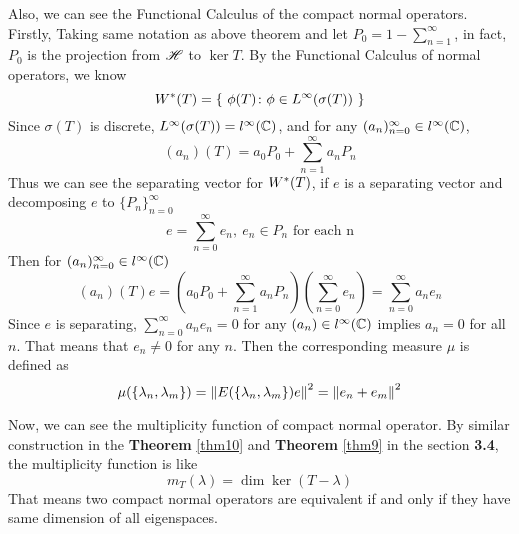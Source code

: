 Also, we can see the Functional Calculus of the compact normal operators. Firstly, Taking same notation as above theorem and let $P_0 = 1-\sum_{n=1}^{\infty}$, in fact, $P_0$ is the projection from $\mathscr{H}$ to $\ker{T}$. By the Functional Calculus of normal operators, we know
\begin{equation*}
	W^{*}(T) = \{~\phi(T) \colon \phi \in L^{\infty}(\sigma(T))~\}
\end{equation*}
Since $\sigma(T)$ is discrete, $L^{\infty}(\sigma(T)) = l^{\infty}(\mathbb{C})$, and for any $(a_n)_{n=0}^{\infty} \in l^{\infty}(\mathbb{C})$,
\begin{equation*}
	(a_n)(T) = a_0 P_0 + \sum_{n=1}^{\infty} a_n P_n
\end{equation*}
Thus we can see the separating vector for $W^{*}(T)$, if $e$ is a separating vector and decomposing $e$ to $\{P_n\}_{n=0}^{\infty}$
\begin{equation*}
	e = \sum_{n=0}^{\infty} e_n,~ e_n \in P_n \text{ for each n}
\end{equation*} 
Then for $(a_n)_{n=0}^{\infty} \in l^{\infty}(\mathbb{C})$
\begin{equation*}
	(a_n)(T)e = (a_0 P_0 + \sum_{n=1}^{\infty} a_n P_n)(\sum_{n=0}^{\infty} e_n) = \sum_{n=0}^{\infty} a_n e_n
\end{equation*}
Since $e$ is separating, $\sum_{n=0}^{\infty} a_n e_n = 0$ for any $(a_n) \in l^{\infty}(\mathbb{C})$ implies $a_n = 0$ for all $n$. That means that $e_n \neq 0$ for any $n$. Then the corresponding measure $\mu$ is defined as
\begin{equation*}
	\mu(\{\lambda_n,\lambda_m\}) = \left\lVert E(\{\lambda_n,\lambda_m\})e\right\lVert^2 = \left\lVert e_n+e_m\right\lVert^2
\end{equation*}

Now, we can see the multiplicity function of compact normal operator. By similar construction in the \textbf{Theorem} \ref{thm10} and \textbf{Theorem} \ref{thm9} in the section \textbf{3.4}, the multiplicity function is like
\begin{equation*}
	m_T(\lambda) = \dim{\ker{(T-\lambda)}}
\end{equation*}
That means two compact normal operators are equivalent if and only if they have same dimension of all eigenspaces.

